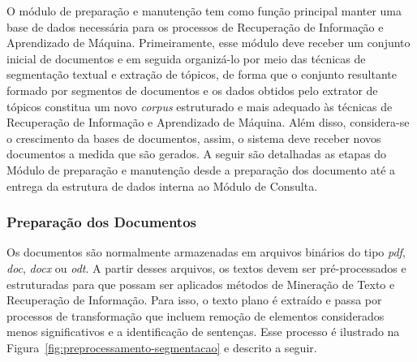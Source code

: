 O módulo de preparação e manutenção tem como função principal manter uma base de dados necessária para os processos de Recuperação de Informação e Aprendizado de Máquina. Primeiramente, esse módulo deve receber um conjunto inicial de documentos e em seguida organizá-lo por meio das técnicas de segmentação textual e extração de tópicos, de forma que o conjunto resultante formado por segmentos de documentos e os dados obtidos pelo extrator de tópicos constitua um novo \textit{corpus} estruturado e mais adequado às técnicas de Recuperação de Informação e Aprendizado de Máquina. Além disso, considera-se o crescimento da bases de documentos, assim, o sistema deve receber novos documentos a medida que são gerados. A seguir são detalhadas as etapas do Módulo de preparação e manutenção desde a preparação dos documento até a entrega da estrutura de dados interna ao Módulo de Consulta. 






\subsubsection{Preparação dos Documentos}


Os documentos são normalmente armazenadas em arquivos binários do tipo \textit{pdf}, \textit{doc}, \textit{docx} ou \textit{odt}. A partir desses arquivos, os textos devem ser pré-processados e estruturadas para que possam ser aplicados métodos de Mineração de Texto e Recuperação de Informação. Para isso, o texto plano é extraído e passa por processos de transformação que incluem remoção de elementos considerados menos significativos e a identificação de sentenças. Esse processo é ilustrado na Figura~\ref{fig:preprocessamento-segmentacao} e descrito a seguir.


